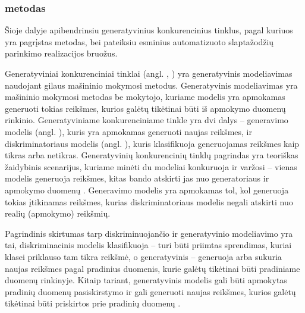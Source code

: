 \documentclass{VUMIFInfBakalaurinis}
\begin{document}


\subsubsection{ metodas}
Šioje dalyje apibendrinsiu generatyvinius konkurencinius tinklus, pagal kuriuos 
yra pagrįstas  metodas, bei pateiksiu esminius automatizuoto 
slaptažodžių parinkimo realizacijos bruožus.

Generatyviniai konkurenciniai tinklai (angl. , ) yra generatyvinis modeliavimas naudojant gilaus 
mašininio mokymosi metodus. Generatyvinis modeliavimas yra mašininio mokymosi 
metodas be mokytojo, kuriame modelis yra apmokamas generuoti tokias reikšmes, 
kurios galėtų tikėtinai būti iš apmokymo duomenų rinkinio. Generatyviniame 
konkurenciniame tinkle yra dvi dalys -- generavimo modelis (angl. 
), kuris yra apmokamas generuoti naujas reikšmes, ir 
diskriminatoriaus modelis (angl. ), kuris 
klasifikuoja generuojamas reikšmes kaip tikras arba netikras. Generatyvinių 
konkurencinių tinklų pagrindas yra teoriškas žaidybinis scenarijus, kuriame 
minėti du modeliai konkuruoja ir varžosi -- vienas modelis generuoja reikšmes, 
kitas bando atskirti jas nuo generatoriaus ir apmokymo duomenų \cite{DL}. 
Generavimo modelis yra apmokamas tol, kol generuoja tokias įtikinamas reikšmes, 
kurias diskriminatoriaus modelis negali atskirti nuo realių (apmokymo) reikšmių.

Pagrindinis skirtumas tarp diskriminuojančio ir generatyvinio modeliavimo yra 
tai, diskriminacinis modelis klasifikuoja -- turi būti priimtas sprendimas, 
kuriai klasei priklauso tam tikra reikšmė, o generatyvinis -- generuoja arba 
sukuria naujas reikšmes pagal pradinius duomenis, kurie galėtų tikėtinai būti 
pradiniame duomenų rinkinyje. Kitaip tariant, generatyvinis modelis gali būti 
apmokytas pradinių duomenų pasiskirstymo ir gali generuoti naujas reikšmes, 
kurios galėtų tikėtinai būti priskirtos prie pradinių duomenų \cite{PRaML}.
\end{document}
